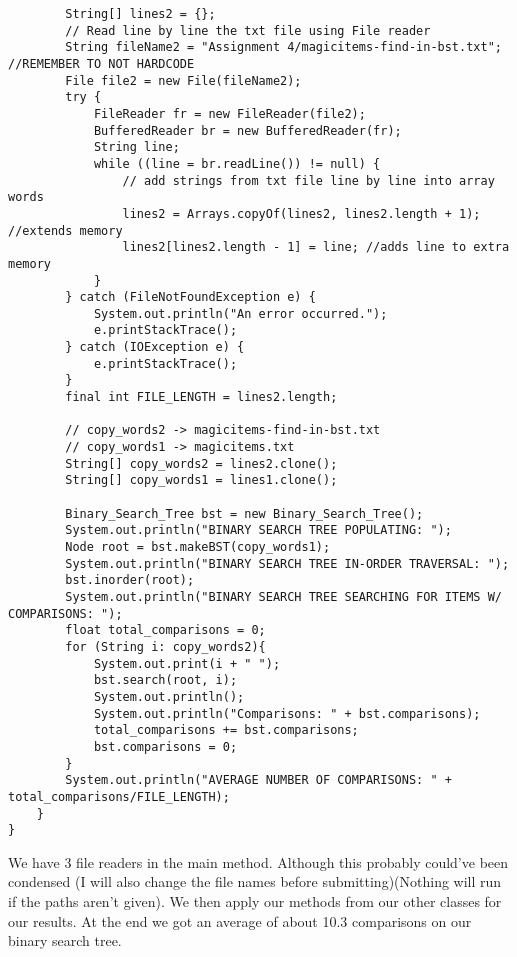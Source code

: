 \documentclass{article}
\begin{document}
\begin{lstlisting}
        String[] lines2 = {};
        // Read line by line the txt file using File reader
        String fileName2 = "Assignment 4/magicitems-find-in-bst.txt";  //REMEMBER TO NOT HARDCODE
        File file2 = new File(fileName2);
        try {
            FileReader fr = new FileReader(file2);
            BufferedReader br = new BufferedReader(fr);
            String line;
            while ((line = br.readLine()) != null) {
                // add strings from txt file line by line into array words
                lines2 = Arrays.copyOf(lines2, lines2.length + 1); //extends memory
                lines2[lines2.length - 1] = line; //adds line to extra memory
            }
        } catch (FileNotFoundException e) {
            System.out.println("An error occurred.");
            e.printStackTrace();
        } catch (IOException e) {
            e.printStackTrace();
        }
        final int FILE_LENGTH = lines2.length;

        // copy_words2 -> magicitems-find-in-bst.txt
        // copy_words1 -> magicitems.txt
        String[] copy_words2 = lines2.clone();
        String[] copy_words1 = lines1.clone();

        Binary_Search_Tree bst = new Binary_Search_Tree();
        System.out.println("BINARY SEARCH TREE POPULATING: ");
        Node root = bst.makeBST(copy_words1);
        System.out.println("BINARY SEARCH TREE IN-ORDER TRAVERSAL: ");
        bst.inorder(root);
        System.out.println("BINARY SEARCH TREE SEARCHING FOR ITEMS W/ COMPARISONS: ");
        float total_comparisons = 0;
        for (String i: copy_words2){
            System.out.print(i + " ");
            bst.search(root, i);
            System.out.println();
            System.out.println("Comparisons: " + bst.comparisons);
            total_comparisons += bst.comparisons;
            bst.comparisons = 0;
        }
        System.out.println("AVERAGE NUMBER OF COMPARISONS: " + total_comparisons/FILE_LENGTH);
    }
}
\end{lstlisting}
We have 3 file readers in the main method.  Although this probably could've been condensed (I will also change the file names before submitting)(Nothing will run if the paths aren't given). We then apply our methods from our other classes for our results.  At the end we got an average of about 10.3 comparisons on our binary search tree.
\end{document}
